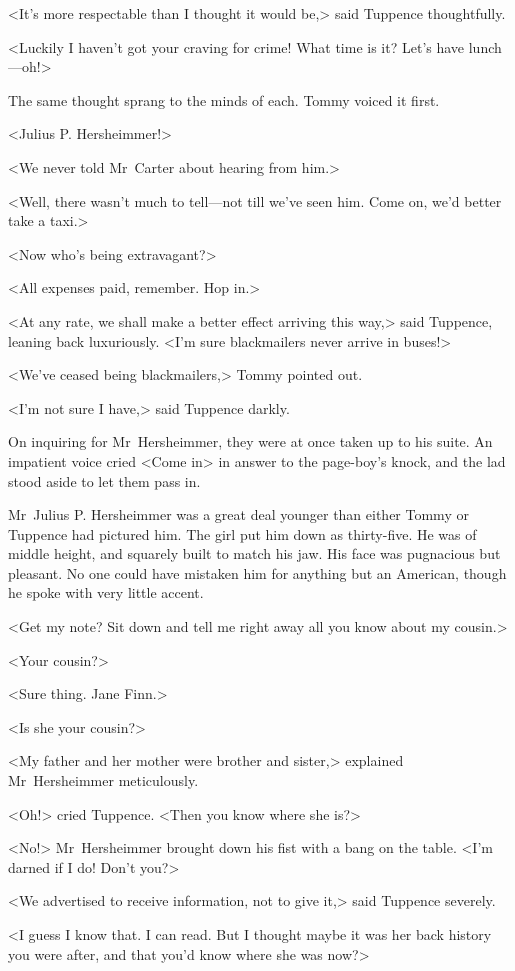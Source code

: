 <It's more respectable than I thought it would be,> said Tuppence thoughtfully.

<Luckily I haven't got your craving for crime! What time is it? Let's have lunch—oh!>

The same thought sprang to the minds of each. Tommy voiced it first.

<Julius P. Hersheimmer!>

<We never told Mr~Carter about hearing from him.>

<Well, there wasn't much to tell—not till we've seen him. Come on, we'd better take a taxi.>

<Now who's being extravagant?>

<All expenses paid, remember. Hop in.>

<At any rate, we shall make a better effect arriving this way,> said Tuppence, leaning back luxuriously. <I'm sure blackmailers never arrive in buses!>

<We've ceased being blackmailers,> Tommy pointed out.

<I'm not sure I have,> said Tuppence darkly.

On inquiring for Mr~Hersheimmer, they were at once taken up to his suite. An impatient voice cried <Come in> in answer to the page-boy's knock, and the lad stood aside to let them pass in.

Mr~Julius P. Hersheimmer was a great deal younger than either Tommy or Tuppence had pictured him. The girl put him down as thirty-five. He was of middle height, and squarely built to match his jaw. His face was pugnacious but pleasant. No one could have mistaken him for anything but an American, though he spoke with very little accent.

<Get my note? Sit down and tell me right away all you know about my cousin.>

<Your cousin?>

<Sure thing. Jane Finn.>

<Is she your cousin?>

<My father and her mother were brother and sister,> explained Mr~Hersheimmer meticulously.

<Oh!> cried Tuppence. <Then you know where she is?>

<No!> Mr~Hersheimmer brought down his fist with a bang on the table. <I'm darned if I do! Don't you?>

<We advertised to receive information, not to give it,> said Tuppence severely.

<I guess I know that. I can read. But I thought maybe it was her back history you were after, and that you'd know where she was now?>

